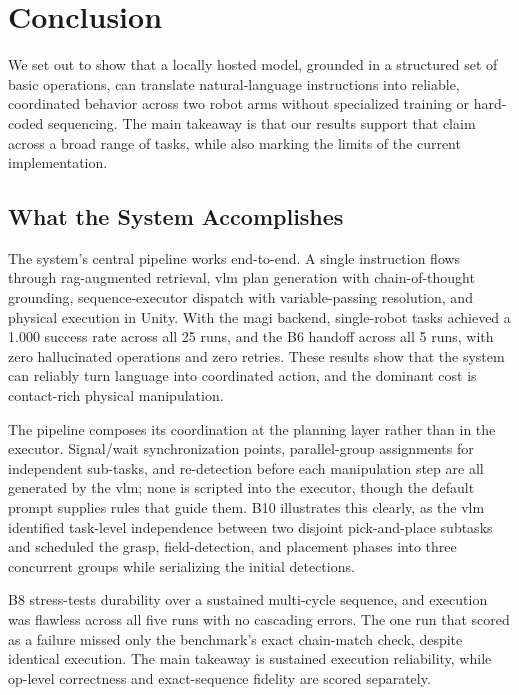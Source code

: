 \chapter{Conclusion}\label{conclusion}
We set out to show that a locally hosted model, grounded in a structured set of basic operations, can translate natural-language instructions into reliable, coordinated behavior across two robot arms without specialized training or hard-coded sequencing. The main takeaway is that our results support that claim across a broad range of tasks, while also marking the limits of the current implementation.

\section{What the System Accomplishes}
The system’s central pipeline works end-to-end. A single instruction flows through \gls{rag}-augmented retrieval, \gls{vlm} plan generation with chain-of-thought grounding, sequence-executor dispatch with variable-passing resolution, and physical execution in Unity. With the \gls{magi} backend, single-robot tasks achieved a 1.000 success rate across all 25 runs, and the B6 handoff across all 5 runs, with zero hallucinated operations and zero retries. These results show that the system can reliably turn language into coordinated action, and the dominant cost is contact-rich physical manipulation.

The pipeline composes its coordination at the planning layer rather than in the executor. Signal/wait synchronization points, parallel-group assignments for independent sub-tasks, and re-detection before each manipulation step are all generated by the \gls{vlm}; none is scripted into the executor, though the default prompt supplies rules that guide them. B10 illustrates this clearly, as the \gls{vlm} identified task-level independence between two disjoint pick-and-place subtasks and scheduled the grasp, field-detection, and placement phases into three concurrent groups while serializing the initial detections.

B8 stress-tests durability over a sustained multi-cycle sequence, and execution was flawless across all five runs with no cascading errors. The one run that scored as a failure missed only the benchmark’s exact chain-match check, despite identical execution. The main takeaway is sustained execution reliability, while op-level correctness and exact-sequence fidelity are scored separately.

